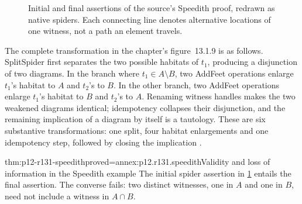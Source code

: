 \begin{figure}[htbp]
\centering
{}
\caption{Initial and final assertions of the source's Speedith proof,
redrawn as native spiders. Each connecting line denotes alternative
locations of one witness, not a path an element travels.}
\label{fig:p12-r131-speedith}
\end{figure}

The complete transformation in the chapter's figure~13.1.9 is as follows.
SplitSpider first separates the two possible habitats of \(t_1\),
producing a disjunction of two diagrams. In the branch where
\(t_1\in A\setminus B\), two AddFeet operations enlarge \(t_1\)'s
habitat to \(A\) and \(t_2\)'s to \(B\). In the other branch,
two AddFeet operations enlarge \(t_1\)'s habitat to \(B\) and
\(t_2\)'s to \(A\). Renaming witness handles makes the two weakened
diagrams identical; idempotency collapses their disjunction, and the
remaining implication of a diagram by itself is a tautology.
These are six substantive transformations: one split, four habitat
enlargements and one idempotency step, followed by closing the implication
\cite[pp.~720--721]{Jamnik2021LogicalDiagrams}
\cite[p.~489, fig.~1]{UrbasJamnikStapleton2015Speedith}.

\begin{hbtheorem}{thm:p12-r131-speedith}{proved=annex:p12.r131.speedith}{Validity and loss of information in the Speedith example}
The initial spider assertion in \cref{fig:p12-r131-speedith} entails
the final assertion. The converse fails: two distinct witnesses, one
in \(A\) and one in \(B\), need not include a witness in
\(A\cap B\).
\end{hbtheorem}

